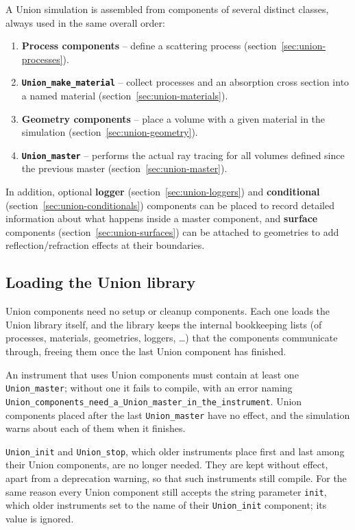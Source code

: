 A Union simulation is assembled from components of several distinct
classes, always used in the same overall order:

\begin{enumerate}
\item \textbf{Process components} -- define a scattering process
  (section~\ref{sec:union-processes}).
\item \textbf{\texttt{Union\_make\_material}} -- collect processes and an
  absorption cross section into a named material
  (section~\ref{sec:union-materials}).
\item \textbf{Geometry components} -- place a volume with a given material
  in the simulation (section~\ref{sec:union-geometry}).
\item \textbf{\texttt{Union\_master}} -- performs the actual ray tracing for
  all volumes defined since the previous master
  (section~\ref{sec:union-master}).
\end{enumerate}

In addition, optional \textbf{logger} (section~\ref{sec:union-loggers}) and
\textbf{conditional} (section~\ref{sec:union-conditionals}) components can be
placed to record detailed information about what happens inside a master
component, and \textbf{surface} components (section~\ref{sec:union-surfaces})
can be attached to geometries to add reflection/refraction effects at their
boundaries.

\subsection{Loading the Union library}
\label{sec:union-library}

Union components need no setup or cleanup components. Each one loads the
Union library itself, and the library keeps the internal bookkeeping lists
(of processes, materials, geometries, loggers, \ldots) that the components communicate through, freeing them once
the last Union component has finished.

An instrument that uses Union components must contain at least one
\texttt{Union\_master}; without one it fails to compile, with an error
naming \texttt{Union\_components\_need\_a\_Union\_master\_in\_the\_instrument}.
Union components placed after the last \texttt{Union\_master} have no
effect, and the simulation warns about each of them when it finishes.

\texttt{Union\_init} and \texttt{Union\_stop}, which older instruments
place first and last among their Union components, are no longer needed.
They are kept without effect, apart from a deprecation warning, so that such
instruments still compile. For the same reason every Union component still
accepts the string parameter \texttt{init}, which older instruments set to the
name of their \texttt{Union\_init} component; its value is ignored.

